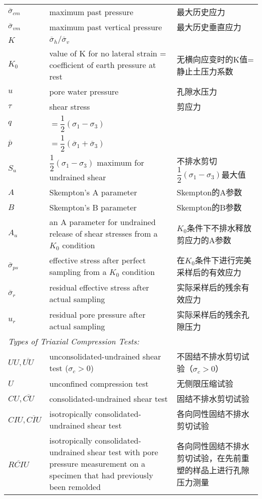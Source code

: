 \begin{appendix}
\begin{longtable}{p{}p{}p{}}
    $\overline{\sigma}_{cm}$ & maximum past pressure & 最大历史应力 \\
    $\overline{\sigma}_{vm}$ & maximum past vertical pressure & 最大历史垂直应力 \\
    $K$ & $\overline{\sigma}_h/\overline{\sigma}_v$ & \\
    $K_0$ & value of K for no lateral strain = coefficient of earth pressure at rest & 无横向应变时的K值=静止土压力系数 \\
    $u$ & pore water pressure & 孔隙水压力 \\
    $\tau$ & shear stress & 剪应力 \\[3pt]
    $q$ & $=\dfrac{1}{2}(\sigma_1-\sigma_3)$ & \\[6pt]
    $\overline{p}$ & $=\dfrac{1}{2}(\overline{\sigma}_1+\overline{\sigma}_3)$ & \\[6pt]
    $S_u$ & $\dfrac{1}{2}(\sigma_1-\sigma_3)$ maximum for undrained shear & 不排水剪切$\dfrac{1}{2}(\sigma_1-\sigma_3)$最大值 \\[3pt]
    $A$ & Skempton's A parameter & Skempton的A参数 \\
    $B$ & Skempton's B parameter & Skempton的B参数 \\
    $A_u$ & an A parameter for undrained release of shear stresses from a $K_0$ condition & $K_0$条件下不排水释放剪应力的A参数 \\
    $\overline{\sigma}_{ps}$ & effective stress after perfect sampling from a $K_0$ condition & 在$K_0$条件下进行完美采样后的有效应力 \\
    $\overline{\sigma}_r$ & residual effective stress after actual sampling & 实际采样后的残余有效应力 \\
    $u_r$ & residual pore pressure after actual sampling & 实际采样后的残余孔隙压力 \\
    \multicolumn{3}{l}{\emph{Types of Triaxial Compression Tests:}} \\
    $UU,\overline{UU}$ & unconsolidated-undrained shear test ($\sigma_c>0$) & 不固结不排水剪切试验（$\sigma_c>0$） \\
    $U$ & unconfined compression test & 无侧限压缩试验 \\     
    $CU,\overline{CU}$ & consolidated-undrained shear test & 固结不排水剪切试验 \\
    $CIU,\overline{CIU}$ & isotropically consolidated-undrained shear test & 各向同性固结不排水剪切试验 \\
    $\overline{RCIU}$ & isotropically consolidated-undrained shear test with pore pressure measurement on a specimen that had previously been remolded & 各向同性固结不排水剪切试验，在先前重塑的样品上进行孔隙压力测量 \\

\end{longtable}
\end{appendix}
